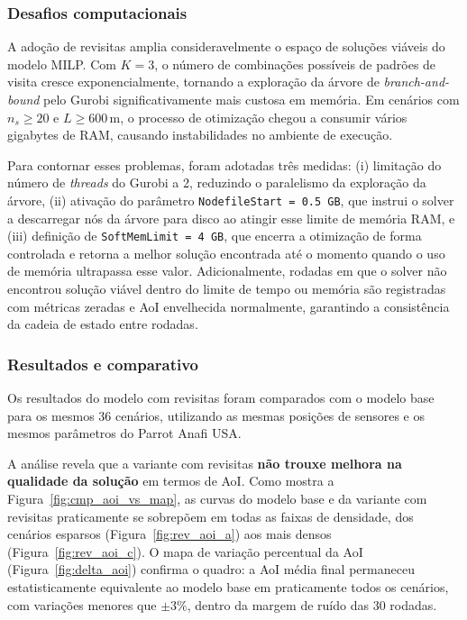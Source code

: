 \subsubsection{Desafios computacionais}
A adoção de revisitas amplia consideravelmente o espaço de soluções viáveis do modelo MILP. Com $K = 3$, o número de combinações possíveis de padrões de visita cresce exponencialmente, tornando a exploração da árvore de \textit{branch-and-bound} pelo Gurobi significativamente mais custosa em memória. Em cenários com $n_s \geq 20$ e $L \geq 600$\,m, o processo de otimização chegou a consumir vários gigabytes de RAM, causando instabilidades no ambiente de execução.

Para contornar esses problemas, foram adotadas três medidas: (i) limitação do número de \textit{threads} do Gurobi a 2, reduzindo o paralelismo da exploração da árvore, (ii) ativação do parâmetro \texttt{NodefileStart = 0.5\,GB}, que instrui o solver a descarregar nós da árvore para disco ao atingir esse limite de memória RAM, e (iii) definição de \texttt{SoftMemLimit = 4\,GB}, que encerra a otimização de forma controlada e retorna a melhor solução encontrada até o momento quando o uso de memória ultrapassa esse valor. Adicionalmente, rodadas em que o solver não encontrou solução viável dentro do limite de tempo ou memória são registradas com métricas zeradas e AoI envelhecida normalmente, garantindo a consistência da cadeia de estado entre rodadas.

\subsubsection{Resultados e comparativo}
Os resultados do modelo com revisitas foram comparados com o modelo base para os mesmos 36 cenários, utilizando as mesmas posições de sensores e os mesmos parâmetros do Parrot Anafi USA.

A análise revela que a variante com revisitas \textbf{não trouxe melhora na qualidade da solução} em termos de AoI. Como mostra a Figura~\ref{fig:cmp_aoi_vs_map}, as curvas do modelo base e da variante com revisitas praticamente se sobrepõem em todas as faixas de densidade, dos cenários esparsos (Figura~\ref{fig:rev_aoi_a}) aos mais densos (Figura~\ref{fig:rev_aoi_c}). O mapa de variação percentual da AoI (Figura~\ref{fig:delta_aoi}) confirma o quadro: a AoI média final permaneceu estatisticamente equivalente ao modelo base em praticamente todos os cenários, com variações menores que $\pm 3\%$, dentro da margem de ruído das 30 rodadas.

